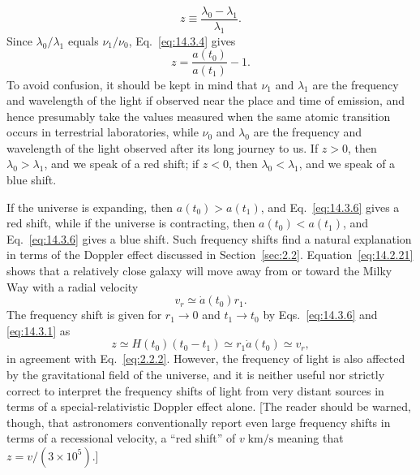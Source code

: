 \begin{equation}
  z\equiv\frac{\lambda_0-\lambda_1}{\lambda_1}.
  \tag{14.3.5}\label{eq:14.3.5}
\end{equation}
Since \(\lambda_0/\lambda_1\) equals \(\nu_1/\nu_0\),
Eq.~\eqref{eq:14.3.4} gives
\begin{equation}
  z=\frac{a(t_0)}{a(t_1)}-1.
  \tag{14.3.6}\label{eq:14.3.6}
\end{equation}
To avoid confusion, it should be kept in mind that \(\nu_1\) and
\(\lambda_1\) are the frequency and wavelength of the light if observed near
the place and time of emission, and hence presumably take the values measured
when the same atomic transition occurs in terrestrial laboratories, while
\(\nu_0\) and \(\lambda_0\) are the frequency and wavelength of the light
observed after its long journey to us. If \(z>0\), then
\(\lambda_0>\lambda_1\), and we speak of a red shift; if \(z<0\), then
\(\lambda_0<\lambda_1\), and we speak of a blue shift.

If the universe is expanding, then \(a(t_0)>a(t_1)\), and
Eq.~\eqref{eq:14.3.6} gives a red shift, while if the universe is
contracting, then \(a(t_0)<a(t_1)\), and Eq.~\eqref{eq:14.3.6} gives a blue
shift. Such frequency shifts find a natural explanation in terms of the
Doppler effect discussed in Section~\ref{sec:2.2}. Equation~\eqref{eq:14.2.21}
shows that a relatively close galaxy will move away from or toward the Milky
Way with a radial velocity
\begin{equation}
  v_r\simeq\dot a(t_0)r_1.
  \tag{14.3.7}\label{eq:14.3.7}
\end{equation}
The frequency shift is given for \(r_1\to0\) and \(t_1\to t_0\) by
Eqs.~\eqref{eq:14.3.6} and \eqref{eq:14.3.1} as
\begin{equation}
  z
  \simeq
  H(t_0)(t_0-t_1)
  \simeq
  r_1\dot a(t_0)
  \simeq
  v_r,
  \tag{14.3.8}\label{eq:14.3.8}
\end{equation}
in agreement with Eq.~\eqref{eq:2.2.2}. However, the frequency of light is
also affected by the gravitational field of the universe, and it is neither
useful nor strictly correct to interpret the frequency shifts of light from
very distant sources in terms of a special-relativistic Doppler effect alone.
[The reader should be warned, though, that astronomers conventionally report
even large frequency shifts in terms of a recessional velocity, a ``red
shift'' of \(v\;\mathrm{km/s}\) meaning that
\(z=v/(3\times10^5)\).]

